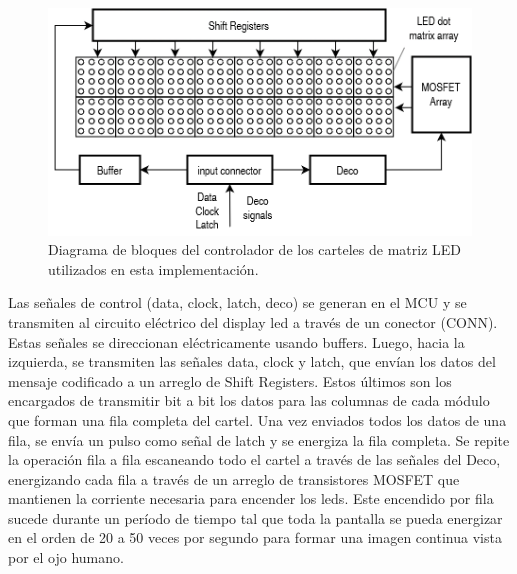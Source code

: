 \begin{figure}[ht]
	\centering
	\includegraphics[width=1\textwidth]{./Figures/diagDriverLED.png}
	\caption{Diagrama de bloques del controlador de los carteles de matriz LED utilizados en esta implementación.}
	\label{fig:diagDriverLED}
\end{figure}

Las señales de control (data, clock, latch, deco) se generan en el MCU y se transmiten al circuito eléctrico del display led a través de un conector (CONN). Estas señales se direccionan eléctricamente usando buffers. Luego, hacia la izquierda, se transmiten las señales data, clock y latch, que envían los datos del mensaje codificado a un arreglo de Shift Registers. Estos últimos son los encargados de transmitir bit a bit los datos para las columnas de cada módulo que forman una fila completa del cartel. Una vez enviados todos los datos de una fila, se envía un pulso como señal de latch y se energiza la fila completa. Se repite la operación fila a fila escaneando todo el cartel a través de las señales del Deco, energizando cada fila a través de un arreglo de transistores MOSFET que mantienen la corriente necesaria para encender los leds. Este encendido por fila sucede durante un período de tiempo tal que toda la pantalla se pueda energizar en el orden de 20 a 50 veces por segundo para formar una imagen continua vista por el ojo humano.\\

